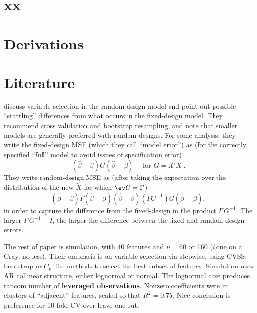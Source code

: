 \documentclass[12pt]{article}
\begin{document}
\section{ xx }
\label{sec:}




\section{ Derivations  }
\label{sec:derive}


\section{ Literature }
\label{sec:lit}

\citet{breiman92s} discuss variable selection in the random-design model and
 point out possible ``startling'' differences from what occurs in the
 fixed-design model.  They recommend cross validation and bootstrap resampling,
 and note that smaller models are generally preferred with random designs. For
 some analysis, they write the fixed-design MSE (which they call ``model
 error'') as (for the correctly specified ``full'' model to avoid issues of
 specification error)
 \begin{displaymath}
  (\hat\beta - \beta) G (\hat\beta - \beta) \quad \mbox{ for }
     G = X'X \;. 
 \end{displaymath}
 They write random-design MSE as (after taking the expectation over the
 distribution of the new $\widetilde{X}$ for which $\ev G = \Gamma$)
 \begin{displaymath}
   (\hat\beta - \beta) \Gamma (\hat\beta - \beta)
  (\hat\beta - \beta) (\Gamma G^{-1}) G (\hat\beta - \beta),
 \end{displaymath}
 in order to capture the difference from the fixed-design in the product
 $\Gamma\, G^{-1}$.  The larger $\Gamma\, G^{-1} - I$, the larger the difference
 between the fixed and random-design errors.  

 The rest of paper is simulation, with 40 features and $n = 60$ or 160 (done on
 a Cray, no less).  Their emphasis is on variable selection via stepwise, using
 CVSS, bootstrap or $C_p$-like methods to select the best subset of features.
  Simulation uses AR collinear structure, either lognormal or normal.  The
 lognormal case produces rancom number of {\bf leveraged observations}.  Nonzero
 coefficients were in clusters of ``adjacent'' features, scaled so that $R^2 =
 0.75$.  Nice conclusion is preference for 10-fold CV over leave-one-out.
\end{document}
